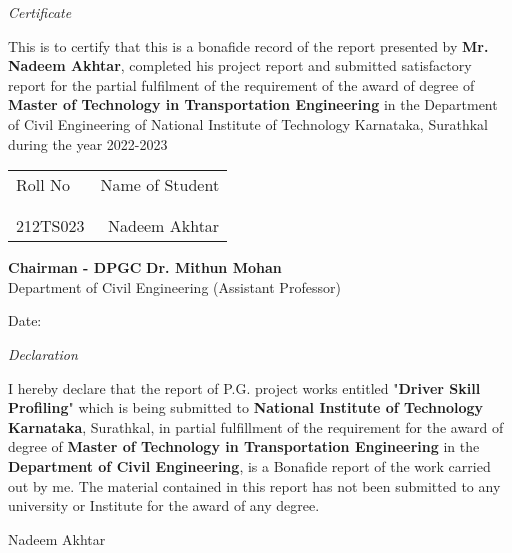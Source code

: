 \documentclass[12pt,letterpaper]{report}
\begin{document}
\newpage
\thispagestyle{empty}
\begin{center}
\emph{\LARGE Certificate}\\[2.5cm]
\end{center}
This is to certify that this is a bonafide record of the report presented by \textbf{Mr. Nadeem Akhtar}, completed his project report and submitted satisfactory report for the partial fulfilment of the requirement of the award of degree of \textbf{Master of Technology in Transportation Engineering} in the Department of Civil Engineering of National Institute of Technology Karnataka, Surathkal during the year 2022-2023\\[1.0cm]
\begin{table}[h]
\centering
\begin{tabular}{lr}
Roll No & Name of Student \\ \\ \hline
\\
212TS023 & Nadeem Akhtar \\
\end{tabular}
\end{table}
\vfill
\textbf{Chairman - DPGC}
\hfill
\textbf{Dr. Mithun Mohan}\\
Department of Civil Engineering
\hfill
(Assistant Professor)\\


\begin{flushleft}
Date: 
\end{flushleft}


\newpage
\thispagestyle{empty}

\begin{center}
\emph{\LARGE Declaration}\\[2.5cm]
\end{center}
I hereby declare that the report of P.G. project works entitled "\textbf{Driver Skill Profiling}" which is being submitted to \textbf{National Institute of Technology Karnataka}, Surathkal, in partial fulfillment of the requirement for the award of degree
of \textbf{Master of Technology in Transportation Engineering} in the \textbf{Department of Civil
Engineering}, is a Bonafide report of the work carried out by me. The material contained
in this report has not been submitted to any university or Institute for the award of any
degree. 
\\[1.0cm]
\vfill

\begin{flushright}
Nadeem Akhtar \\[1.5cm]
\end{flushright}
\end{document}
